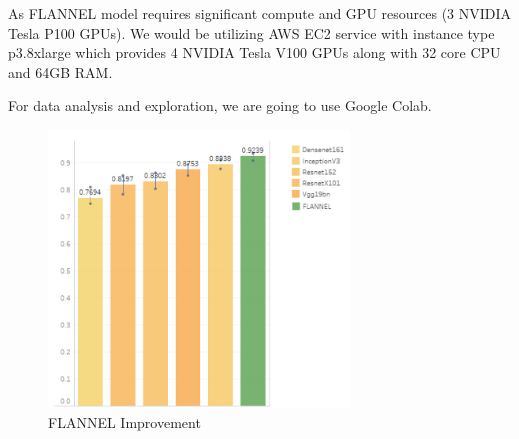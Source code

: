 \documentclass{sigkddExp}
\begin{document}
As FLANNEL model requires significant compute and GPU
resources (3 NVIDIA Tesla P100 GPUs). We would be utilizing AWS EC2 service with
instance type p3.8xlarge which provides 4 NVIDIA Tesla V100 GPUs along with 32
core CPU and 64GB RAM.

For data analysis and exploration, we are going to use Google Colab.


\begin{figure}[h]
    \includegraphics[width=8cm]{../doc/images/F1Score_vs_rest.png}
    \caption{FLANNEL Improvement}
    \label{fig:f1score}
\end{figure}


\newpage
%

\end{document}
